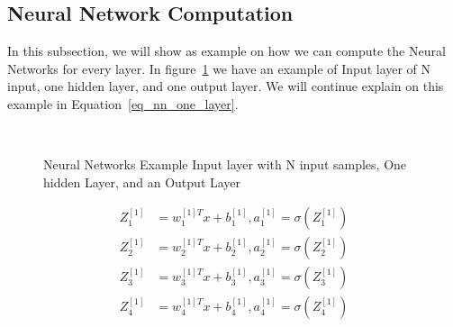 \subsection{Neural Network Computation}

In this subsection, we will show as example on how we can compute the Neural Networks for every layer. In figure~\ref{Fig:NNExample} we have an example of Input layer of N input, one hidden layer, and one output layer. We will continue explain on this example in Equation~\eqref{eq_nn_one_layer}.%


\begin{figure}[!t]

\caption{Neural Networks Example Input layer with N input samples, One hidden Layer, and an Output Layer}~\label{Fig:NNExample}
\end{figure}%

\begin{subequations}\label{eq_nn_one_layer}
\begin{align}
Z_1^{[1]} & = w_1^{[1]T} x + b_1^{[1]} , a_1^{[1]} = \sigma(Z_1^{[1]}) \\
Z_2^{[1]} & = w_2^{[1]T} x + b_2^{[1]} , a_2^{[1]} = \sigma(Z_2^{[1]})\\
Z_3^{[1]} & = w_3^{[1]T} x + b_3^{[1]} , a_3^{[1]} = \sigma(Z_3^{[1]})\\
Z_4^{[1]} & = w_4^{[1]T} x + b_4^{[1]} , a_4^{[1]} = \sigma(Z_4^{[1]})
\end{align}
\end{subequations}

